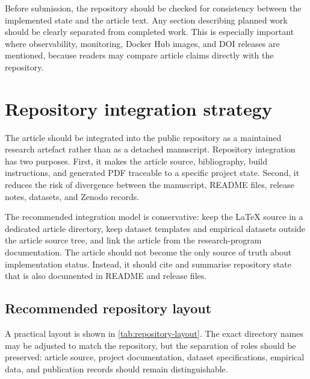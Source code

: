 \documentclass[11pt,a4paper]{article}
\begin{document}
Before submission, the repository should be checked for consistency between the implemented state and the article text. Any section describing planned work should be clearly separated from completed work. This is especially important where observability, monitoring, Docker Hub images, and DOI releases are mentioned, because readers may compare article claims directly with the repository.

\section{Repository integration strategy}
\label{sec:repository-integration}

The article should be integrated into the public repository as a maintained research artefact rather than as a detached manuscript. Repository integration has two purposes. First, it makes the article source, bibliography, build instructions, and generated PDF traceable to a specific project state. Second, it reduces the risk of divergence between the manuscript, README files, release notes, datasets, and Zenodo records.

The recommended integration model is conservative: keep the LaTeX source in a dedicated article directory, keep dataset templates and empirical datasets outside the article source tree, and link the article from the research-program documentation. The article should not become the only source of truth about implementation status. Instead, it should cite and summarise repository state that is also documented in README and release files.

\subsection{Recommended repository layout}
\label{subsec:repository-layout}

A practical layout is shown in \cref{tab:repository-layout}. The exact directory names may be adjusted to match the repository, but the separation of roles should be preserved: article source, project documentation, dataset specifications, empirical data, and publication records should remain distinguishable.
\end{document}
